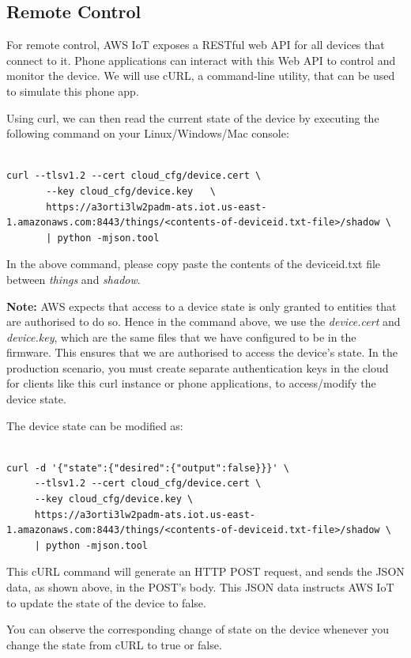 \documentclass[main.tex]{subfiles}
\begin{document}
\subsection{Remote Control}
For remote control, AWS IoT exposes a RESTful web API for all devices that connect to it. Phone applications can interact with this Web API to control and monitor the device. We will use cURL, a command-line utility, that can be used to simulate this phone app. 

Using curl, we can then read the current state of the device by executing the following command on your Linux/Windows/Mac console:
\begin{verbatim}

curl --tlsv1.2 --cert cloud_cfg/device.cert \
       --key cloud_cfg/device.key   \
       https://a3orti3lw2padm-ats.iot.us-east-1.amazonaws.com:8443/things/<contents-of-deviceid.txt-file>/shadow \ 
       | python -mjson.tool

\end{verbatim}

In the above command, please copy paste the contents of the deviceid.txt file between \textit{things} and \textit{shadow}.

\textbf{Note:} AWS expects that access to a device state is only granted to entities that are authorised to do so. Hence in the command above, we use the \textit{device.cert} and \textit{device.key}, which are the same files that we have configured to be in the firmware. This ensures that we are authorised to access the device's state. In the production scenario, you must create separate authentication keys in the cloud for clients like this curl instance or phone applications, to access/modify the device state.

The device state can be modified as:
\begin{verbatim}

curl -d '{"state":{"desired":{"output":false}}}' \ 
     --tlsv1.2 --cert cloud_cfg/device.cert \ 
     --key cloud_cfg/device.key \ 
     https://a3orti3lw2padm-ats.iot.us-east-1.amazonaws.com:8443/things/<contents-of-deviceid.txt-file>/shadow \
     | python -mjson.tool
\end{verbatim}

This cURL command will generate an HTTP POST request, and sends the JSON data, as shown above, in the POST's body. This JSON data instructs AWS IoT to update the state of the device to false.

You can observe the corresponding change of state on the device whenever you change the state from cURL to true or false.
\end{document}
